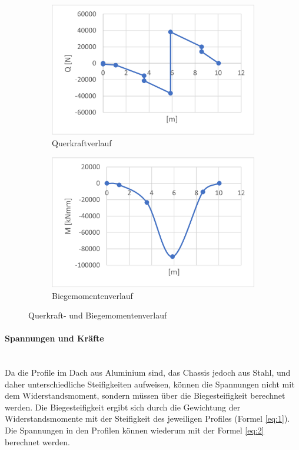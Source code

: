   \begin{figure}[!ht]
    \centering
      \begin{subfigure}{.5\textwidth}
        \centering
        \includegraphics[width=.98\linewidth]{04_figures/1.1 Q.png}
        \caption{Querkraftverlauf}
        \label{1.1 Q}
      \end{subfigure}%
      \begin{subfigure}{.5\textwidth}
        \centering
        \includegraphics[width=.98\linewidth]{04_figures/1.1 M.png}
        \caption{Biegemomentenverlauf}
        \label{1.1 M}
      \end{subfigure}%
    \caption{Querkraft- und Biegemomentenverlauf}
  \label{1.1 QM}
  \end{figure}

  \paragraph{Spannungen und Kräfte}\mbox{}\\
  Da die Profile im Dach aus Aluminium sind, das Chassis jedoch aus Stahl, und daher unterschiedliche Steifigkeiten aufweisen, können die Spannungen nicht mit dem Widerstandsmoment, sondern müssen über die Biegesteifigkeit berechnet werden. Die Biegesteifigkeit ergibt sich durch die Gewichtung der Widerstandsmomente mit der Steifigkeit des jeweiligen Profiles (Formel \ref{eq:1}). Die Spannungen in den Profilen können wiederum mit der Formel \ref{eq:2} berechnet werden.

